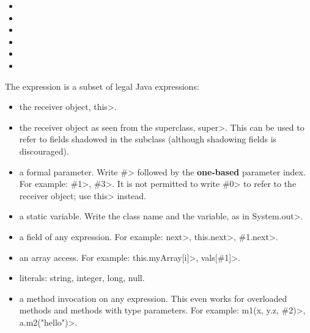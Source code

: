 \begin{itemize}
\item {}
\item {}
\item {}
\item {}
\item {}
\item {}
\end{itemize}

The expression is a subset of legal Java expressions:

\begin{itemize}
\item
  the receiver object, \<this>.
\item
  the receiver object as seen from the superclass, \<super>.  This can be used
  to refer to fields shadowed in the subclass (although shadowing fields is
  discouraged).
\item
  a formal parameter.  Write \<\#> followed by the \textbf{one-based} parameter
  index.  For example: \<\#1>, \<\#3>.  It is not permitted to write \<\#0> to
  refer to the receiver object; use \<this> instead.

\item
  a static variable.  Write the class name and the variable, as in
  \<System.out>.

\item
  a field of any expression.  For example:  \<next>,
  \<this.next>, \<\#1.next>. %

\item
  an array access.  For example:  \<this.myArray[i]>, \<vals[\#1]>.

\item literals: string, integer, long, null.

\item a method invocation on any expression.
  This even works for overloaded methods and methods with type parameters.
  For example:
  \<m1(x, y.z, \#2)>, \<a.m2("hello")>.

\end{itemize}

